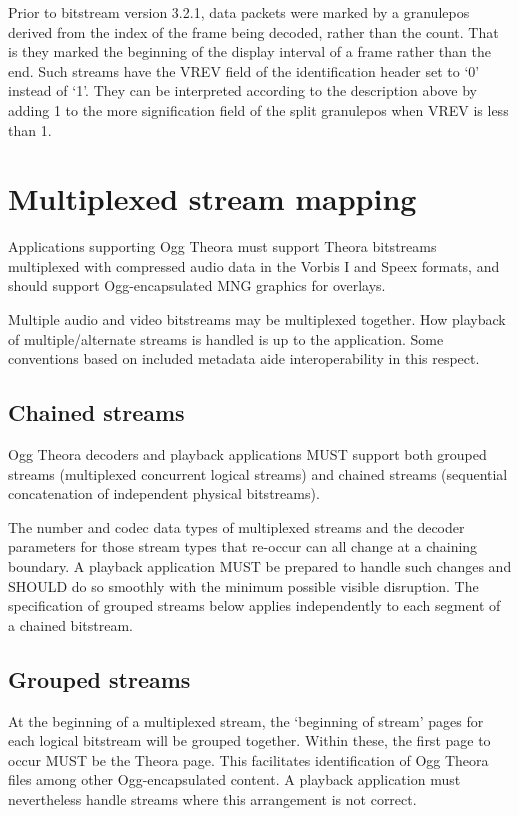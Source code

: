 \documentclass[9pt,letterpaper]{book}
\numberwithin{equation}{chapter}
\numberwithin{figure}{chapter}
\numberwithin{table}{chapter}
\begin{document}
Prior to bitstream version 3.2.1, data packets were marked by a 
granulepos derived from the index of the frame being decoded,
rather than the count. That is they marked the beginning of the
display interval of a frame rather than the end. Such streams
have the VREV field of the identification header set to `0' 
instead of `1'. They can be interpreted according to the description
above by adding 1 to the more signification field of the split 
granulepos when VREV is less than 1.

\section{Multiplexed stream mapping}

Applications supporting Ogg Theora must support Theora bitstreams
 multiplexed with compressed audio data in the Vorbis I and Speex
 formats, and should support Ogg-encapsulated MNG graphics for overlays.

Multiple audio and video bitstreams may be multiplexed together.
How playback of multiple/alternate streams is handled is up to the
 application.
Some conventions based on included metadata aide interoperability
 in this respect.

\subsection{Chained streams}

Ogg Theora decoders and playback applications MUST support both grouped
 streams (multiplexed concurrent logical streams) and chained streams
 (sequential concatenation of independent physical bitstreams).

The number and codec data types of multiplexed streams and the decoder
 parameters for those stream types that re-occur can all change at a
 chaining boundary.
A playback application MUST be prepared to handle such changes and
 SHOULD do so smoothly with the minimum possible visible disruption.
The specification of grouped streams below applies independently to each
 segment of a chained bitstream.

\subsection{Grouped streams}

At the beginning of a multiplexed stream, the `beginning of stream'
 pages for each logical bitstream will be grouped together.
Within these, the first page to occur MUST be the Theora page.
This facilitates identification of Ogg Theora files among other
 Ogg-encapsulated content.
A playback application must nevertheless handle streams where this
 arrangement is not correct.
\end{document}
